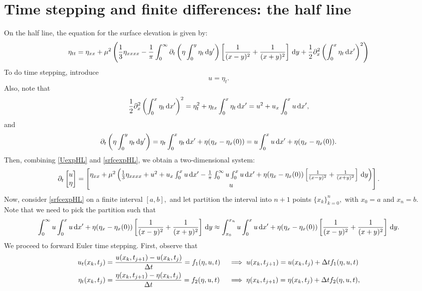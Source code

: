 \documentclass[10pt,reqno,oneside,a4paper, landscape]{article}
\begin{document}
\section{Time stepping and finite differences: the half line}
On the half line, the equation for the surface elevation is given by:
\begin{equation}\label{srfcexpHL}
\eta_{tt} = \eta_{xx} + \mu^2 \left( \frac{1}{3} \eta_{xxxx}  - \frac{1}{\pi} \int_0^\infty \partial_t \left( \eta \int^{y}_0\eta_{t} \,\mathrm{d} y' \right) \left[ \frac{1}{(x-y)^2} + \frac{1}{(x+y)^2} \right] \,\mathrm{d} y + \frac{1}{2} \partial^2_x\left(\int^{x}_0\eta_{t} \,\mathrm{d} x' \right)^2\right) 
\end{equation}
To do time stepping, introduce
\begin{equation}\label{UexpHL}
u = \eta_t.
\end{equation}
Also, note that 
\[ 
\frac{1}{2}\partial_x^2 \left(\int^{x}_{0} \eta_t \,\mathrm{d} x' \right)^2 = \eta_t^2 + \eta_{tx} \int^x_{0}\eta_t \,\mathrm{d} x' = u^2 + u_{x} \int^x_{0}u \,\mathrm{d} x',
\]
and 
\[ 
\partial_t \left( \eta \int^{y}_0\eta_{t} \,\mathrm{d} y' \right)  = \eta_t \int^x_{0} \eta_t \,\mathrm{d} x' + \eta(\eta_x - \eta_x(0)) = u\int^x_{0} u\,\mathrm{d} x' + \eta(\eta_x - \eta_x(0)).
\]
Then, combining \eqref{UexpHL} and \eqref{srfcexpHL}, we obtain a two-dimensional system:
\begin{equation}\label{systemeq1HL}
  \partial_t \begin{bmatrix} u \\ \eta \end{bmatrix} =
  \begin{bmatrix} 
  \eta_{xx} +  \mu^2\left( \frac{1}{3} \eta_{xxxx} + u^2 + u_{x} \int^x_{0}u \,\mathrm{d} x' - \frac{1}{\pi} \int^{\infty}_0 u\int^x_{0} u\,\mathrm{d} x' + \eta(\eta_x - \eta_x(0)) \left[ \frac{1}{(x-y)^2} + \frac{1}{(x+y)^2} \right] \,\mathrm{d} y \right) \\
  u \end{bmatrix}.
\end{equation}
Now, consider \eqref{srfcexpHL} on a finite interval $[a,b],$ and let partition the interval into $n+1$ points $\{ x_k\}^n_{k=0},$ with $x_0 = a$ and $x_n = b.$ Note that we need to pick the partition such that 
\[ 
\int^{\infty}_0 u\int^x_{0} u\,\mathrm{d} x' + \eta(\eta_x - \eta_x(0)) \left[ \frac{1}{(x-y)^2} + \frac{1}{(x+y)^2} \right] \,\mathrm{d} y \approx \int^{x_n}_{x_0} u\int^x_{0} u\,\mathrm{d} x' + \eta(\eta_x - \eta_x(0)) \left[ \frac{1}{(x-y)^2} + \frac{1}{(x+y)^2} \right] \,\mathrm{d} y.
\]
We proceed to forward Euler time stepping. First, observe that
\begin{align*}
u_t(x_k, t_j) &= \frac{u(x_k, t_{j+1}) - u(x_k, t_j)}{\Delta t} = f_1(\eta, u, t) &&\implies u(x_k, t_{j+1}) = u(x_k, t_j) + \Delta t f_1(\eta, u, t) \\
\eta_t(x_k, t_j) &= \frac{\eta(x_k, t_{j+1}) - \eta(x_k, t_j)}{\Delta t} = f_2(\eta, u, t) &&\implies \eta(x_k, t_{j+1}) =  \eta(x_k, t_j)+ \Delta t f_2(\eta, u, t), 
\end{align*}
\end{document}
